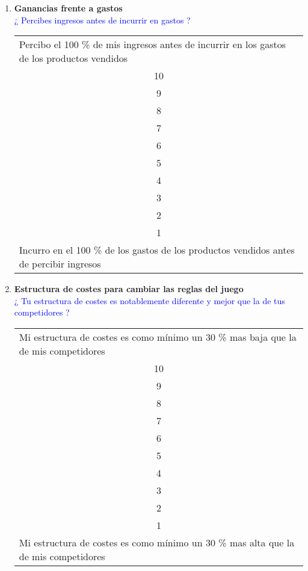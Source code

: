 \documentclass[11pt]{book}
\begin{document}
\begin{enumerate}
\item \textbf{ Ganancias frente a gastos }\\
\textcolor{blue}{ ¿ Percibes ingresos antes de incurrir en gastos ? }
\begin{table}[htbp]
  \centering

    \begin{tabular}{p{12.285em}}
    Percibo el 100 \% de mis ingresos antes de incurrir en los gastos de los productos vendidos \\
    \multicolumn{1}{c}{10} \\
    \multicolumn{1}{c}{9} \\
    \multicolumn{1}{c}{8} \\
    \multicolumn{1}{c}{7} \\
    \multicolumn{1}{c}{6} \\
    \multicolumn{1}{c}{5} \\
    \multicolumn{1}{c}{4} \\
    \multicolumn{1}{c}{3} \\
    \multicolumn{1}{c}{2} \\
    \multicolumn{1}{c}{1} \\
    Incurro en el 100 \% de los gastos de los productos vendidos antes de percibir ingresos \\
    \end{tabular}%
  \label{tab:addlabel}%
\end{table}%

\item \textbf{ Estructura de costes para cambiar las reglas del juego }\\
\textcolor{blue}{¿ Tu estructura de costes es notablemente diferente y mejor que la de tus competidores ?}

\begin{table}[htbp]
  \centering

    \begin{tabular}{p{11.5em}}
    Mi estructura de costes es como mínimo un 30 \% mas baja que la de mis competidores \\
    \multicolumn{1}{c}{10} \\
    \multicolumn{1}{c}{9} \\
    \multicolumn{1}{c}{8} \\
    \multicolumn{1}{c}{7} \\
    \multicolumn{1}{c}{6} \\
    \multicolumn{1}{c}{5} \\
    \multicolumn{1}{c}{4} \\
    \multicolumn{1}{c}{3} \\
    \multicolumn{1}{c}{2} \\
    \multicolumn{1}{c}{1} \\
    Mi estructura de costes es como mínimo un 30 \% mas alta que la de mis competidores \\
    \end{tabular}%
  \label{tab:addlabel}%
\end{table}%


\end{enumerate}
\end{document}
